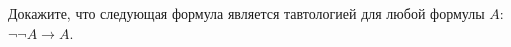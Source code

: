 
Докажите, что следующая формула является тавтологией для любой
формулы $A$: $\neg\neg A \rightarrow A$.